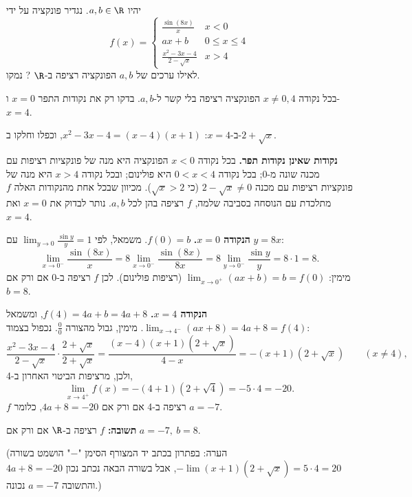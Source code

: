 
\begin{question}
יהיו $a,b\in\R$. נגדיר פונקציה על ידי
\[
f(x)=\begin{cases}
\frac{\sin(8x)}{x} & x<0\\
ax+b & 0\le x\le 4\\
\frac{x^2-3x-4}{2-\sqrt{x}} & x>4
\end{cases}
\]
לאילו ערכים של $a,b$ הפונקציה רציפה ב-$\R$ ? נמקו.
\end{question}

\begin{hint}
בכל נקודה $x\neq0,4$ הפונקציה רציפה בלי קשר ל-$a,b$. בדקו רק את נקודות התפר $x=0$ ו-$x=4$.
\end{hint}

\begin{hint}
ב-$x=4$: $x^2-3x-4=(x-4)(x+1)$, וכפלו וחלקו ב-$2+\sqrt x$.
\end{hint}

\begin{solution}
\textbf{נקודות שאינן נקודות תפר.} בכל נקודה $x<0$ הפונקציה היא מנה של פונקציות רציפות עם מכנה שונה מ-0; בכל נקודה $0<x<4$ היא פולינום; ובכל נקודה $x>4$ היא מנה של פונקציות רציפות עם מכנה $2-\sqrt x\neq0$ (כי $\sqrt x>2$). מכיוון שבכל אחת מהנקודות האלה $f$ מתלכדת עם הנוסחה בסביבה שלמה, $f$ רציפה בהן לכל $a,b$. נותר לבדוק את $x=0$ ואת $x=4$.

\textbf{הנקודה $x=0$.} $f(0)=b$. משמאל, לפי $\lim_{y\to0}\frac{\sin y}{y}=1$ עם $y=8x$:
\[
\lim_{x\to0^-}\frac{\sin(8x)}{x}=8\lim_{x\to0^-}\frac{\sin(8x)}{8x}=8\lim_{y\to0^-}\frac{\sin y}{y}=8\cdot1=8 .
\]
מימין: $\lim_{x\to0^+}(ax+b)=b=f(0)$ (רציפות פולינום). לכן $f$ רציפה ב-0 אם ורק אם $\boxed{b=8}$.

\textbf{הנקודה $x=4$.} $f(4)=4a+b=4a+8$, ומשמאל $\lim_{x\to4^-}(ax+8)=4a+8=f(4)$. מימין, גבול מהצורה $\frac00$. נכפול בצמוד:
\[
\frac{x^2-3x-4}{2-\sqrt x}\cdot\frac{2+\sqrt x}{2+\sqrt x}=\frac{(x-4)(x+1)(2+\sqrt x)}{4-x}=-(x+1)(2+\sqrt x)\qquad(x\neq4),
\]
ולכן, מרציפות הביטוי האחרון ב-4,
\[
\lim_{x\to4^+}f(x)=-(4+1)(2+\sqrt4)=-5\cdot4=-20 .
\]
$f$ רציפה ב-4 אם ורק אם $4a+8=-20$, כלומר $\boxed{a=-7}$.

\textbf{תשובה:} $f$ רציפה ב-$\R$ אם ורק אם $a=-7,\ b=8$.

(הערה: בפתרון בכתב יד המצורף הסימן "$-$" הושמט בשורה $-\lim(x+1)(2+\sqrt x)=5\cdot4=20$, אבל בשורה הבאה נכתב נכון $4a+8=-20$ והתשובה $a=-7$ נכונה.)
\end{solution}
